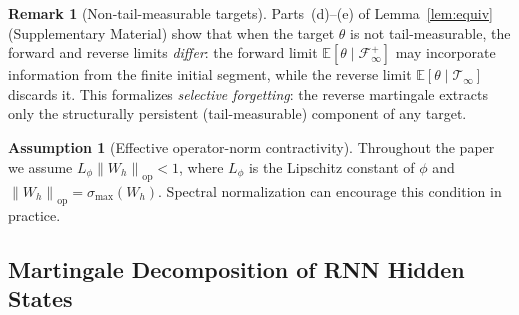 \documentclass[bj,authoryear]{imsart}
\theoremstyle{plain}
\theoremstyle{definition}
\newtheorem{remark}{Remark}[section]
\newtheorem{assumption}{Assumption}[section]
\newcommand{\E}{\mathbb{E}}
\newcommand{\F}{\mathcal{F}}
\newcommand{\Tsig}{\mathcal{T}_\infty}
\newcommand{\norm}[1]{\left\lVert #1 \right\rVert}
\newcommand{\given}{\mid}
\begin{document}
\begin{remark}[Non-tail-measurable targets]
\label{rem:nontail}
  Parts~(d)--(e) of Lemma~\ref{lem:equiv} (Supplementary Material) show that
  when the target $\theta$ is not tail-measurable,
  the forward and reverse limits \emph{differ}: the forward limit
  $\E[\theta\given\F_\infty^+]$ may incorporate information from the finite
  initial segment, while the reverse limit $\E[\theta\given\Tsig]$ discards it.
  This formalizes \emph{selective forgetting}: the reverse martingale extracts
  only the structurally persistent (tail-measurable) component of any target.
\end{remark}


\begin{assumption}[Effective operator-norm contractivity]
\label{ass:spectral}
  Throughout the paper we assume $L_\phi\norm{W_h}_{\mathrm{op}}<1$,
  where $L_\phi$ is the Lipschitz constant of $\phi$ and
  $\norm{W_h}_{\mathrm{op}}=\sigma_{\max}(W_h)$.
  Spectral normalization \citep{miyato2018spectral} can encourage this
  condition in practice.
\end{assumption}

\subsection{Martingale Decomposition of RNN Hidden States}
\label{sec:rnn-decomp}

\end{document}
